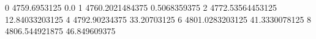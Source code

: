 0 4759.6953125 0.0
1 4760.2021484375 0.5068359375
2 4772.53564453125 12.84033203125
4 4792.90234375 33.20703125
6 4801.0283203125 41.3330078125
8 4806.544921875 46.849609375
